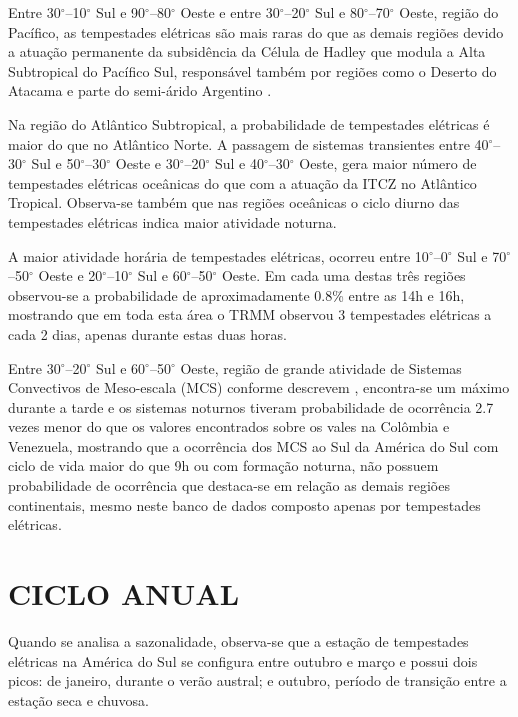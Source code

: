 Entre 30$^{\circ}$--10$^{\circ}$ Sul e 90$^{\circ}$--80$^{\circ}$ Oeste e entre 30$^{\circ}$--20$^{\circ}$ Sul e 80$^{\circ}$--70$^{\circ}$ Oeste, região do Pacífico, as tempestades elétricas são mais raras do que as demais regiões devido a atuação permanente da subsidência da Célula de Hadley que modula a Alta Subtropical do Pacífico Sul, responsável também por regiões como o Deserto do Atacama e parte do semi-árido Argentino \cite{reboita2010regimes}.

Na região do Atlântico Subtropical, a probabilidade de tempestades elétricas é maior do que no Atlântico Norte. A passagem de sistemas transientes entre 40$^{\circ}$--30$^{\circ}$ Sul e 50$^{\circ}$--30$^{\circ}$ Oeste e 30$^{\circ}$--20$^{\circ}$ Sul e 40$^{\circ}$--30$^{\circ}$ Oeste, gera maior número de tempestades elétricas oceânicas do que com a atuação da ITCZ no Atlântico Tropical. Observa-se também que nas regiões oceânicas o ciclo diurno das tempestades elétricas indica maior atividade noturna.


A maior atividade horária de tempestades elétricas, ocorreu entre 10$^{\circ}$--0$^{\circ}$ Sul e 70$^{\circ}$--50$^{\circ}$ Oeste e 20$^{\circ}$--10$^{\circ}$ Sul e 60$^{\circ}$--50$^{\circ}$ Oeste. Em cada uma destas três regiões observou-se a probabilidade de aproximadamente 0.8\% entre as 14h e 16h, mostrando que em toda esta área o TRMM observou 3 tempestades elétricas a cada 2 dias, apenas durante estas duas horas.


Entre 30$^{\circ}$--20$^{\circ}$ Sul e 60$^{\circ}$--50$^{\circ}$ Oeste,  região de grande atividade de Sistemas Convectivos de Meso-escala (MCS) conforme descrevem , encontra-se um máximo durante a tarde e os sistemas noturnos tiveram probabilidade de ocorrência 2.7 vezes menor do que os valores encontrados sobre os vales na Colômbia e Venezuela, mostrando que a ocorrência dos MCS ao Sul da América do Sul com ciclo de vida maior do que 9h ou com formação noturna, não possuem probabilidade de ocorrência que destaca-se em relação as demais regiões continentais, mesmo neste banco de dados composto apenas por tempestades elétricas. 

\section{CICLO ANUAL}

Quando se analisa a sazonalidade, observa-se que a estação de tempestades elétricas na América do Sul se configura entre outubro e março e possui dois picos: de janeiro, durante o verão austral; e outubro, período de transição entre a estação seca e chuvosa. 


